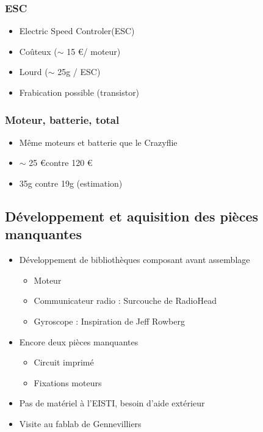 \documentclass{beamer}
\begin{document}
{	\begin{frame} %
	  \frametitle{ESC}
	
	  \begin{itemize}
	    \item Electric Speed Controler(ESC)
	    \item Coûteux ($\sim$ 15 \euro / moteur)
	    \item Lourd ($\sim$ 25g / ESC)
	    \item Frabication possible (transistor)
	  \end{itemize}
	\end{frame}
	
	\begin{frame} %
	  \frametitle{Moteur, batterie, total}
	
	  \begin{itemize}
	    \item Même moteurs et batterie que le Crazyflie
	    \item $\sim$ 25 \euro \space contre 120 \euro
	    \item 35g contre 19g (estimation)
	  \end{itemize}
	\end{frame}

      \subsection{Développement et aquisition des pièces manquantes}
	\begin{frame} %
	  \begin{itemize}
	    \item Développement de bibliothèques composant avant assemblage
	    \begin{itemize}
	      \item Moteur
	      \item Communicateur radio : Surcouche de RadioHead
	      \item Gyroscope : Inspiration de Jeff Rowberg 
	    \end{itemize}
	  \end{itemize}
	\end{frame}
	
	\begin{frame} %
	  \begin{itemize}
	    \item Encore deux pièces manquantes
	    \begin{itemize}
	      \item Circuit imprimé
	      \item Fixations moteurs
	    \end{itemize}
	    \item Pas de matériel à l'EISTI, besoin d'aide extérieur
	    \item Visite au fablab de Gennevilliers
	  \end{itemize}
	\end{frame}

}
\end{document}
